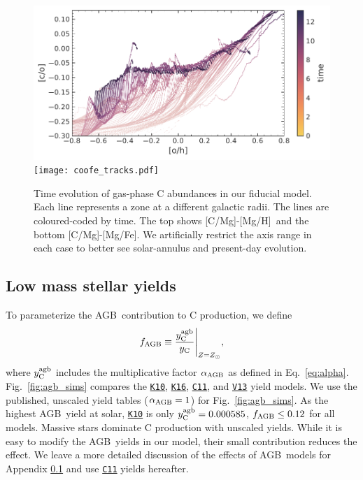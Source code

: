 \documentclass[fleqn,usenatbib]{mnras}
\newcommand{\cxi}{\texttt{\hyperlink{C11}{C11}}}
\newcommand{\kx}{\texttt{\hyperlink{K10}{K10}}}
\newcommand{\kxvi}{\texttt{\hyperlink{K16}{K16}}}
\newcommand{\vxiii}{\texttt{\hyperlink{V13}{V13}}}
\newcommand{\agb}{AGB}
\newcommand{\caah}{[C/Mg]-[Mg/H]}
\newcommand{\caafe}{[C/Mg]-[Mg/Fe]}
\newcommand{\Yct}{\ensuremath{y_{\rm C}}}
\newcommand{\Ycagb}{\ensuremath{y_{\rm C}^{\rm agb}}}
\begin{document}
\begin{figure}
\centering
\includegraphics{all_the_tracks.pdf}
\texttt{[image: coofe\_tracks.pdf]}
\caption[Carbon Chemical Evolution Tracks]{
    Time evolution of gas-phase C abundances in our fiducial model.
    Each line represents a zone at a different galactic radii. The lines are coloured-coded by time. The top shows \caah\ and the bottom \caafe. We artificially restrict the axis range in each case to better see solar-annulus and present-day evolution.
}
\label{fig:c_evo}
\end{figure}

\subsection{Low mass stellar yields}\label{sec:f-z-models}


To parameterize the \agb\ contribution to C production, we define 
\begin{equation}\label{eq:f_agb}
    f_{\rm AGB} \equiv \frac{\Ycagb}{\Yct}\Bigg\vert_{Z=Z_\odot},
\end{equation}
where  $\Ycagb$ includes the multiplicative factor $\alpha_{\rm AGB}$ as defined in Eq.~\ref{eq:alpha}.
Fig.~\ref{fig:agb_sims} compares the \kx{}, \kxvi{}, \cxi{}, and \vxiii{} yield models. We use the published, unscaled yield tables ($\alpha_{\rm AGB}=1$) for Fig.~\ref{fig:agb_sims}. As the highest \agb\ yield at solar, \kx{} is only $\Ycagb=0.000585$, $f_{\rm AGB} \leq 0.12$ for all models. Massive stars dominate C production with unscaled yields.  While it is easy to modify the \agb\ yields in our model, their small contribution reduces the effect. We leave a more detailed discussion of the effects of \agb\ models for Appendix \ref{sec:f-z-models} and use \cxi{} yields hereafter.
\end{document}
